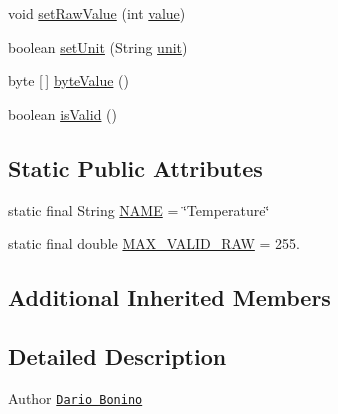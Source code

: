 \begin{DoxyCompactItemize}
void \hyperlink{classit_1_1polito_1_1elite_1_1enocean_1_1enj_1_1eep_1_1eep26_1_1attributes_1_1_e_e_p26_temperature_inverse_linear_aa5781c8d8322fab22e48ff60c8775e87}{set\+Raw\+Value} (int \hyperlink{classit_1_1polito_1_1elite_1_1enocean_1_1enj_1_1eep_1_1_e_e_p_attribute_af4d7e34642004bb6ccfae51e925c983d}{value})
\item 
boolean \hyperlink{classit_1_1polito_1_1elite_1_1enocean_1_1enj_1_1eep_1_1eep26_1_1attributes_1_1_e_e_p26_temperature_inverse_linear_acc4041b4ad2b50be98f141f8c6916222}{set\+Unit} (String \hyperlink{classit_1_1polito_1_1elite_1_1enocean_1_1enj_1_1eep_1_1_e_e_p_attribute_a3fe5b3d613c30066354ad66eeb23b8ae}{unit})
\item 
byte \mbox{[}$\,$\mbox{]} \hyperlink{classit_1_1polito_1_1elite_1_1enocean_1_1enj_1_1eep_1_1eep26_1_1attributes_1_1_e_e_p26_temperature_inverse_linear_a058b20d143a40583ff99c4d0dd779490}{byte\+Value} ()
\item 
boolean \hyperlink{classit_1_1polito_1_1elite_1_1enocean_1_1enj_1_1eep_1_1eep26_1_1attributes_1_1_e_e_p26_temperature_inverse_linear_ae70165c5ab3ce5403201ccc57a02712c}{is\+Valid} ()
\end{DoxyCompactItemize}
\subsection*{Static Public Attributes}
\begin{DoxyCompactItemize}
\item 
static final String \hyperlink{classit_1_1polito_1_1elite_1_1enocean_1_1enj_1_1eep_1_1eep26_1_1attributes_1_1_e_e_p26_temperature_inverse_linear_a19125654990459fdd103aa929a73be77}{N\+A\+ME} = \char`\"{}Temperature\char`\"{}
\item 
static final double \hyperlink{classit_1_1polito_1_1elite_1_1enocean_1_1enj_1_1eep_1_1eep26_1_1attributes_1_1_e_e_p26_temperature_inverse_linear_a2f2c10de158b324898245f35e61e6e42}{M\+A\+X\+\_\+\+V\+A\+L\+I\+D\+\_\+\+R\+AW} = 255.
\end{DoxyCompactItemize}
\subsection*{Additional Inherited Members}


\subsection{Detailed Description}
\begin{DoxyAuthor}{Author}
\href{mailto:dario.bonino@gmail.com}{\tt Dario Bonino} 
\end{DoxyAuthor}


